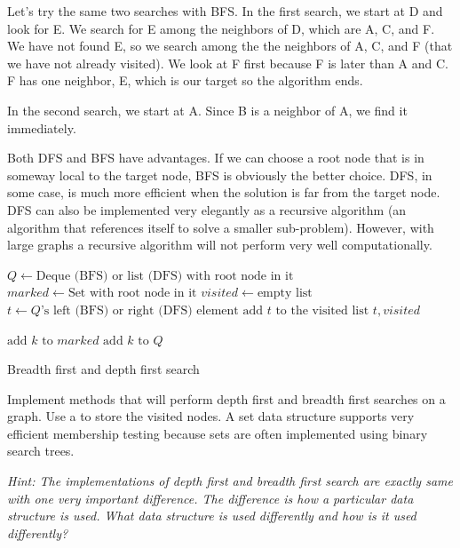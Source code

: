 Let's try the same two searches with BFS.
In the first search, we start at D and look for E.
We search for E among the neighbors of D, which are A, C, and F.
We have not found E, so we search among the the neighbors of A, C, and F (that we have not already visited).
We look at F first because F  is later than A and C.
F has one neighbor, E, which is our target so the algorithm ends.

In the second search, we start at A.
Since B is a neighbor of A, we find it immediately.

Both DFS and BFS have advantages.  
If we can choose a root node that is in someway local to the target node, BFS is obviously the better choice.
DFS, in some case, is much more efficient when the solution is far from the target node.
DFS can also be implemented very elegantly as a recursive algorithm (an algorithm that references itself to solve a smaller sub-problem).
However, with large graphs a recursive algorithm will not perform very well computationally.

\begin{algorithm}
\begin{algorithmic}[1]
	\State $Q \gets \text{Deque (BFS) or list (DFS) with root node in it}$	
	\State $marked \gets \text{Set with root node in it}$	
	\State $visited \gets \text{empty list}$	
							
		\State $t \gets Q\text{'s left (BFS) or right (DFS) element}$	
		\State $\text{add }t \text{ to the visited list}$
									
			\State {} $t,visited$
		
		\Else										{}
					\State $\text{add } k \text{ to } marked$
					\State $\text{add } k \text{ to } Q$
				\EndIf
			\EndFor
		\EndIf
	\EndWhile
\EndProcedure
\end{algorithmic}
\caption{Breadth first and depth first search}
\label{alg:BFSDFS}
\end{algorithm}

\begin{problem}
Implement methods that will perform depth first and breadth first searches on a graph.
Use a  to store the visited nodes.  
A set data structure supports very efficient membership testing because
sets are often implemented using binary search trees.

\textit{Hint: The implementations of depth first and breadth first search are exactly same with one very important difference.
The difference is how a particular data structure is used.  What data structure is used differently and how is it used differently?}
\end{problem}


